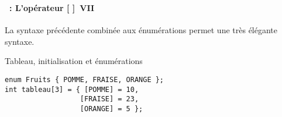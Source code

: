 \begin{frame}[containsverbatim]
  \frametitle{\secname}
  \framesubtitle{\subsecname~: L'opérateur [ ]~VII}

  La syntaxe précédente combinée aux énumérations permet une très élégante syntaxe.
  \vspace{0.5cm}
  \begin{exampleblock}{Tableau, initialisation et énumérations}
    \begin{verbatim}
enum Fruits { POMME, FRAISE, ORANGE };
int tableau[3] = { [POMME] = 10, 
                  [FRAISE] = 23, 
                  [ORANGE] = 5 };\end{verbatim}
  \end{exampleblock}
\end{frame}

